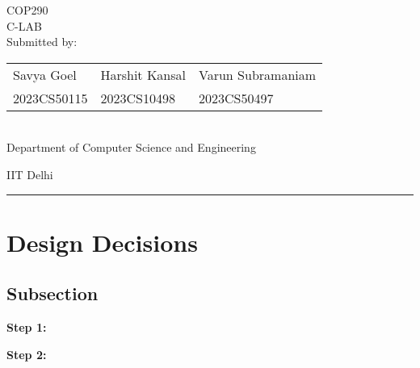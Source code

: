 \documentclass[12pt,letterpaper, onecolumn]{exam}
\begin{document}
\begingroup  
    \centering
    \LARGE COP290\\
    \LARGE C-LAB\\[1em]
    \large Submitted by:\\[0.8em]
    \begin{tabular}{>{\centering\arraybackslash}m{4cm} >{\centering\arraybackslash}m{4cm} >{\centering\arraybackslash}m{5cm}}
        Savya Goel & Harshit Kansal & Varun Subramaniam \\
        2023CS50115 & 2023CS10498 & 2023CS50497
    \end{tabular}\\[1em]
    \large Department of Computer Science and Engineering\par
    \large IIT Delhi\par
\endgroup


\rule{\textwidth}{0.4pt}
\section{Design Decisions}
\subsection{Subsection}
\vspace{0.1cm}

\noindent \textbf{Step 1:}

\vspace{0.4cm}

\noindent \textbf{Step 2:}

\vspace{0.4cm}


\pagestyle{plain} %


\end{document}
